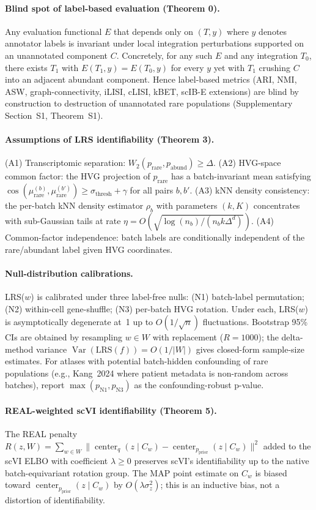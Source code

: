 \paragraph{Blind spot of label-based evaluation (Theorem 0).}
Any evaluation functional $E$ that depends only on $(T,y)$ where $y$ denotes annotator labels is invariant under local integration perturbations supported on an unannotated component $C$. Concretely, for any such $E$ and any integration $T_{0}$, there exists $T_{1}$ with $E(T_{1},y)=E(T_{0},y)$ for every $y$ yet with $T_{1}$ crushing $C$ into an adjacent abundant component. Hence label-based metrics (ARI, NMI, ASW, graph-connectivity, iLISI, cLISI, kBET, scIB-E extensions) are blind by construction to destruction of unannotated rare populations (Supplementary Section~S1, Theorem~S1).

\paragraph{Assumptions of LRS identifiability (Theorem 3).}
(A1) Transcriptomic separation: $W_{2}(p_{\text{rare}}, p_{\text{abund}})\geq \Delta$.
(A2) HVG-space common factor: the HVG projection of $p_{\text{rare}}$ has a batch-invariant mean satisfying $\cos(\mu_{\text{rare}}^{(b)}, \mu_{\text{rare}}^{(b')})\geq \sigma_{\text{thresh}} + \gamma$ for all pairs $b,b'$.
(A3) kNN density consistency: the per-batch kNN density estimator $\rho_{b}$ with parameters $(k,K)$ concentrates with sub-Gaussian tails at rate $\eta = O(\sqrt{\log(n_{b})/(n_{b} k \Delta^{d})})$.
(A4) Common-factor independence: batch labels are conditionally independent of the rare/abundant label given HVG coordinates.

\paragraph{Null-distribution calibrations.}
LRS($w$) is calibrated under three label-free nulls: (N1) batch-label permutation; (N2) within-cell gene-shuffle; (N3) per-batch HVG rotation. Under each, LRS($w$) is asymptotically degenerate at~1 up to $O(1/\sqrt{n})$ fluctuations. Bootstrap 95\% CIs are obtained by resampling $w\in W$ with replacement ($R=1000$); the delta-method variance $\operatorname{Var}(\mathrm{LRS}(f))=O(1/|W|)$ gives closed-form sample-size estimates. For atlases with potential batch-hidden confounding of rare populations (e.g., Kang~2024 where patient metadata is non-random across batches), report $\max(p_{\text{N1}}, p_{\text{N3}})$ as the confounding-robust p-value.

\paragraph{REAL-weighted scVI identifiability (Theorem 5).}
The REAL penalty $R(z,W)=\sum_{w\in W}\|\operatorname{center}_{q}(z\mid C_{w}) - \operatorname{center}_{p_{\text{prior}}}(z\mid C_{w})\|^{2}$ added to the scVI ELBO with coefficient $\lambda\geq 0$ preserves scVI's identifiability up to the native batch-equivariant rotation group. The MAP point estimate on $C_{w}$ is biased toward $\operatorname{center}_{p_{\text{prior}}}(z\mid C_{w})$ by $O(\lambda \sigma_{z}^{2})$; this is an inductive bias, not a distortion of identifiability.
